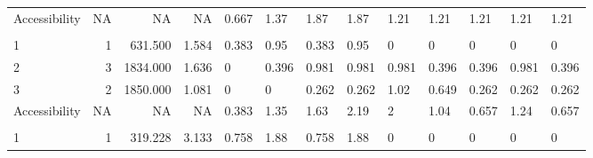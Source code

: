 \documentclass[10pt,letterpaper]{article}
\begin{document}
\begin{landscape}
\begin{table}[t]
\begin{tabular}{lrrrlllllllll}
\hspace{1em}Accessibility & NA & NA & NA & \textcolor[HTML]{46039F}{0.667} & \textcolor[HTML]{7B02A8}{1.37} & \textcolor[HTML]{5102A3}{1.87} & \textcolor[HTML]{5601A4}{1.87} & \textcolor[HTML]{B02991}{1.21} & \textcolor[HTML]{0D0887}{1.21} & \textcolor[HTML]{0D0887}{1.21} & \textcolor[HTML]{B02991}{1.21} & \textcolor[HTML]{0D0887}{1.21}\\
\addlinespace[0.3em]
\multicolumn{13}{l}{\textbf{Stepwise Impedance}}\\
\hspace{1em}1 & 1 & 631.500 & 1.584 & \textcolor[HTML]{BD3886}{0.383} & \textcolor[HTML]{BD3886}{0.95} & \textcolor[HTML]{FDB52E}{0.383} & \textcolor[HTML]{DD5E66}{0.95} & \textcolor[HTML]{FCCE25}{0} & \textcolor[HTML]{FCCE25}{0} & \textcolor[HTML]{FCCE25}{0} & \textcolor[HTML]{FCCE25}{0} & \vphantom{1} \textcolor[HTML]{FCCE25}{0}\\
\hspace{1em}2 & 3 & 1834.000 & 1.636 & \textcolor[HTML]{FCCE25}{0} & \textcolor[HTML]{F3874A}{0.396} & \textcolor[HTML]{D8576B}{0.981} & \textcolor[HTML]{DA5A6A}{0.981} & \textcolor[HTML]{C9447A}{0.981} & \textcolor[HTML]{E26660}{0.396} & \textcolor[HTML]{E26660}{0.396} & \textcolor[HTML]{C9447A}{0.981} & \vphantom{1} \textcolor[HTML]{E26660}{0.396}\\
\hspace{1em}3 & 2 & 1850.000 & 1.081 & \textcolor[HTML]{FCCE25}{0} & \textcolor[HTML]{FCCE25}{0} & \textcolor[HTML]{FCCC25}{0.262} & \textcolor[HTML]{FCCE25}{0.262} & \textcolor[HTML]{C6417E}{1.02} & \textcolor[HTML]{B52F8C}{0.649} & \textcolor[HTML]{F3854B}{0.262} & \textcolor[HTML]{FCA238}{0.262} & \vphantom{1} \textcolor[HTML]{F3854B}{0.262}\\
\hspace{1em}Accessibility & NA & NA & NA & \textcolor[HTML]{BD3886}{0.383} & \textcolor[HTML]{8004A8}{1.35} & \textcolor[HTML]{7E03A8}{1.63} & \textcolor[HTML]{0D0887}{2.19} & \textcolor[HTML]{330597}{2} & \textcolor[HTML]{4D02A1}{1.04} & \textcolor[HTML]{B42E8D}{0.657} & \textcolor[HTML]{AC2694}{1.24} & \textcolor[HTML]{B42E8D}{0.657}\\
\addlinespace[0.3em]
\multicolumn{13}{l}{\textbf{3SFCA}}\\
\hspace{1em}1 & 1 & 319.228 & 3.133 & \textcolor[HTML]{0D0887}{0.758} & \textcolor[HTML]{0D0887}{1.88} & \textcolor[HTML]{EB7655}{0.758} & \textcolor[HTML]{5502A4}{1.88} & \textcolor[HTML]{FCCE25}{0} & \textcolor[HTML]{FCCE25}{0} & \textcolor[HTML]{FCCE25}{0} & \textcolor[HTML]{FCCE25}{0} & \textcolor[HTML]{FCCE25}{0}\\

\end{tabular}
\end{table}
\end{landscape}
\end{document}
